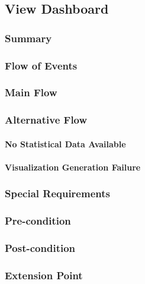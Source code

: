 \subsection{View Dashboard}
\subsubsection{Summary}

\subsubsection{Flow of Events}
\subsubsection*{Main Flow}

\subsubsection*{Alternative Flow}
\paragraph{No Statistical Data Available}

\paragraph{Visualization Generation Failure}

\subsubsection{Special Requirements}

\subsubsection{Pre-condition}

\subsubsection{Post-condition}

\subsubsection*{Extension Point}